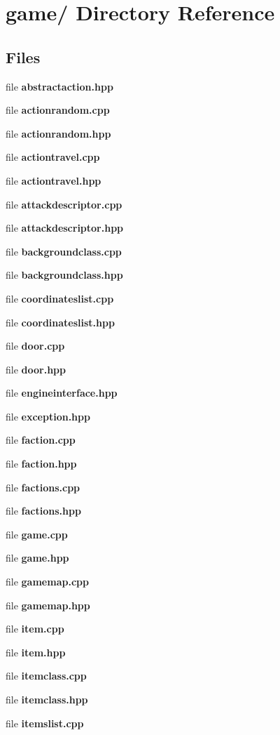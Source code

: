 \section{game/ Directory Reference}
\label{dir_000000}
\subsection*{Files}
\begin{CompactItemize}
\item 
file {\bf abstractaction.hpp}
\item 
file {\bf actionrandom.cpp}
\item 
file {\bf actionrandom.hpp}
\item 
file {\bf actiontravel.cpp}
\item 
file {\bf actiontravel.hpp}
\item 
file {\bf attackdescriptor.cpp}
\item 
file {\bf attackdescriptor.hpp}
\item 
file {\bf backgroundclass.cpp}
\item 
file {\bf backgroundclass.hpp}
\item 
file {\bf coordinateslist.cpp}
\item 
file {\bf coordinateslist.hpp}
\item 
file {\bf door.cpp}
\item 
file {\bf door.hpp}
\item 
file {\bf engineinterface.hpp}
\item 
file {\bf exception.hpp}
\item 
file {\bf faction.cpp}
\item 
file {\bf faction.hpp}
\item 
file {\bf factions.cpp}
\item 
file {\bf factions.hpp}
\item 
file {\bf game.cpp}
\item 
file {\bf game.hpp}
\item 
file {\bf gamemap.cpp}
\item 
file {\bf gamemap.hpp}
\item 
file {\bf item.cpp}
\item 
file {\bf item.hpp}
\item 
file {\bf itemclass.cpp}
\item 
file {\bf itemclass.hpp}
\item 
file {\bf itemslist.cpp}
\item 

\end{CompactItemize}
